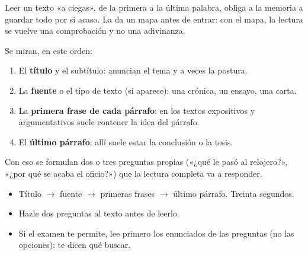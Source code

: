 

Leer un texto «a ciegas», de la primera a la última palabra, obliga a la memoria a guardar todo por si acaso. La
 da un mapa antes de entrar: con el mapa, la lectura se vuelve una comprobación y no una adivinanza.

Se miran, en este orden:
\begin{enumerate}
  \item El \textbf{título} y el subtítulo: anuncian el tema y a veces la postura.
  \item La \textbf{fuente} o el tipo de texto (si aparece): una crónica, un ensayo, una carta.
  \item La \textbf{primera frase de cada párrafo}: en los textos expositivos y argumentativos suele contener la idea del
  párrafo.
  \item El \textbf{último párrafo}: allí suele estar la conclusión o la tesis.
\end{enumerate}

Con eso se formulan dos o tres preguntas propias («¿qué le pasó al relojero?», «¿por qué se acaba el oficio?») que la
lectura completa va a responder.


\begin{regla}
\begin{itemize}
  \item Título $\to$ fuente $\to$ primeras frases $\to$ último párrafo. Treinta segundos.
  \item Hazle dos preguntas al texto antes de leerlo.
  \item Si el examen te permite, lee primero los enunciados de las preguntas (no las opciones): te dicen qué buscar.
\end{itemize}
\end{regla}

